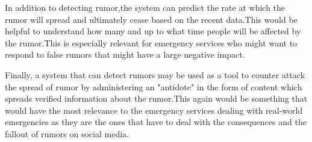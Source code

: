 	\par
	In addition to detecting rumor,the system can predict the rate at which the rumor will spread and ultimately cease based on the recent data.This would be helpful to understand how many and up to what time people will be affected by the rumor.This is especially relevant for emergency services who might want to respond to false rumors that might have a large negative impact.
	\\
	\par
	Finally, a system that can detect rumors may be used as a tool to counter attack the spread of rumor by administering an "antidote" in the form of content which spreads verified information about the rumor.This again would be something that would have the most relevance to the emergency services dealing with real-world emergencies as they are the ones that have to deal with the consequences and the fallout of rumors on social media. 

